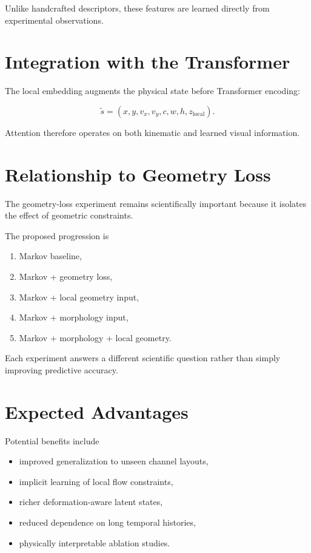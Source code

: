 \documentclass[11pt]{article}
\begin{document}
Unlike handcrafted descriptors, these features are learned directly from experimental observations.

\section{Integration with the Transformer}

The local embedding augments the physical state before Transformer encoding:

\[
\tilde{s}=
(x,y,v_x,v_y,c,w,h,z_{\mathrm{local}}).
\]

Attention therefore operates on both kinematic and learned visual information.

\section{Relationship to Geometry Loss}

The geometry-loss experiment remains scientifically important because it isolates the effect of geometric constraints.

The proposed progression is

\begin{enumerate}
\item Markov baseline,
\item Markov + geometry loss,
\item Markov + local geometry input,
\item Markov + morphology input,
\item Markov + morphology + local geometry.
\end{enumerate}

Each experiment answers a different scientific question rather than simply improving predictive accuracy.

\section{Expected Advantages}

Potential benefits include

\begin{itemize}
\item improved generalization to unseen channel layouts,
\item implicit learning of local flow constraints,
\item richer deformation-aware latent states,
\item reduced dependence on long temporal histories,
\item physically interpretable ablation studies.
\end{itemize}
\end{document}
